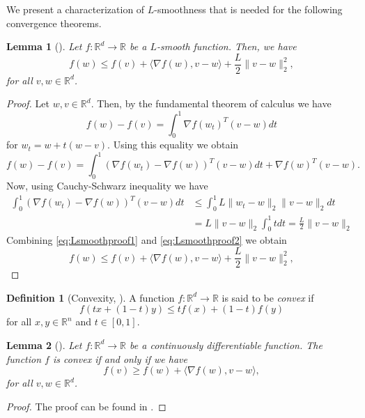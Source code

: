 \documentclass[12pt]{article}
\newtheorem{lemma}[lemma]{Lemma}
\theoremstyle{definition}
\newtheorem{definition}[definition]{Definition}
\numberwithin{equation}{section}
\newcommand{\R}{\mathbb{R}}
\newcommand{\norm}[1]{\lVert{#1}\rVert_2}
\begin{document}
We present a characterization of $L$-smoothness that is needed for the following convergence theorems.
\begin{lemma}[]
  Let $f : \mathbb{R}^d \rightarrow \mathbb{R}$ be a $L$-smooth function. Then, we have 
  \begin{equation}
    f(w) \leq f(v) + \langle \nabla f(w), v - w \rangle + \frac{L}{2} \norm{ v - w }^2,
  \end{equation}
  for all $v, w \in \mathbb{R}^d$.
\end{lemma}
\begin{proof}
  Let $w, v \in \mathbb{R}^d$. Then, by the fundamental theorem of calculus we have
  $$
  f(w) - f(v) = \int_0^1 \nabla f(w_t)^T(v-w)dt 
  $$
  for $w_t = w + t(w-v)$.
  Using this equality we obtain
  \begin{equation}
    \label{eq:Lsmoothproof1}
    f(w) - f(v) = \int_0^1 (\nabla f(w_t) - \nabla f(w))^T(v-w)dt + \nabla f(w)^T(v-w).
  \end{equation}
  Now, using Cauchy-Schwarz inequality we have
  \begin{align}
    \label{eq:Lsmoothproof2}
    \int_0^1 (\nabla f(w_t) - \nabla f(w))^T(v-w)dt &\leq \int_0^1 L \norm{w_t-w} \norm{v-w}dt \\
    &= L \norm{v-w} \int_0^1 t dt = \frac{L}{2} \norm{v-w}
  \end{align}
  Combining \eqref{eq:Lsmoothproof1} and \eqref{eq:Lsmoothproof2} we obtain
  \begin{equation*}
    f(w) \leq f(v) + \langle \nabla f(w), v - w \rangle + \frac{L}{2} \norm{v - w}^2,
  \end{equation*}
\end{proof}
\begin{definition}[Convexity, ]
  A function $f : \mathbb{R}^d \rightarrow \mathbb{R}$ is said to be \emph{convex} if 
  \begin{equation}
    f(tx+(1-t)y) \leq tf(x)+(1-t)f(y)
  \end{equation}
  for all $x,y \in \mathbb{R}^n$ and $t \in [0,1]$.
\end{definition}
\begin{lemma}[]
  \label{lemma:convexity}
  Let $f : \mathbb{R}^d \rightarrow \mathbb{R}$ be a continuously differentiable function. The function $f$ is convex if and only if we have
  \begin{equation*}
    f(v) \geq f(w) + \langle \nabla f(w), v-w \rangle,
  \end{equation*}
  for all $v,w \in \R^d$.
\end{lemma}
\begin{proof}
  The proof can be found in \autocite{boydConvexOptimization2004}.
\end{proof}
\end{document}
